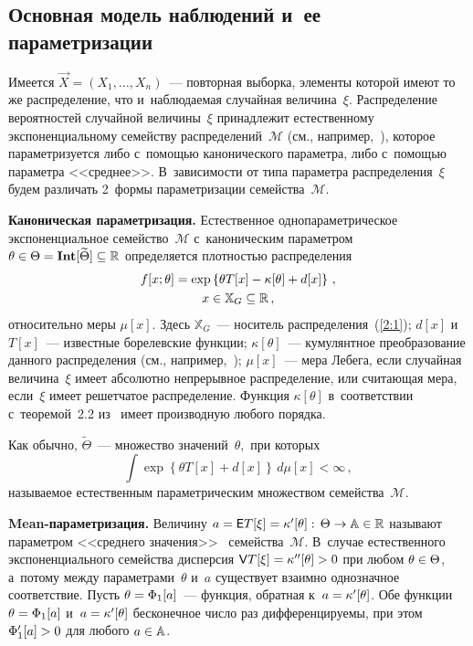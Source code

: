 \begin{multicols}{2}
 \vspace*{-9pt}

\section{Основная модель наблюдений и~ее параметризации}

\vspace*{-3pt}

   Имеется  $\vec{X}=(X_1 ,\ldots ,X_n) $~--- повторная выборка, элементы которой имеют то же распределение, что и~наблюдаемая случайная величина~$\xi$.
   Распределение вероятностей случайной величины~$\xi$ принадлежит естественному экспоненциальному семейству распределений~$\mathcal{M}$ (см., например,~\cite{15-ch}), которое параметризуется либо с~по\-мощью канонического параметра,  либо с~помощью параметра <<среднее>>.
   В~зависимости от типа параметра распределения~$\xi$ будем различать
   2~формы параметризации семейства~$\mathcal{M}$.

  \textbf{Каноническая параметризация.} Естественное однопараметрическое
  экспоненциальное семейство~$\mathcal{M}$ с~каноническим параметром
  $\theta  \hm\in \Theta \hm=\textbf{Int} [\widetilde{\Theta}]\subseteq \Rp$
  определяется плотностью распределения
 \begin{multline}
 f[x;\theta] =  \exp \left\{\theta T[x] - \kappa[\theta]+d[x]\right\}\,,\\
x\in {\mathbb X}_G \subseteq \mathbb{R}\,,
 \label{2:1}
 \end{multline}
  относительно меры $\mu[x]$. Здесь ${\mathbb X}_G$~--- 
  носитель распределения~(\ref{2:1}); $d[x]$ 
  и~$T[x]$~--- известные борелевские функции;
  $\kappa[\theta]$~--- кумулянтное преобразование данного распределения
  (см., например,~\cite[c.~13]{16-ch});
  $\mu[x]$~--- мера Лебега, если случайная величина~$\xi$
  имеет абсолютно непрерывное распределение, или считающая мера,
  если~$\xi$  имеет решетчатое распределение. Функция $\kappa[\theta]$
  в~соответствии с~теоремой~2.2 из~\cite{16-ch} имеет производную любого порядка.

 Как обычно, $\widetilde{\Theta}$~--- множество  значений~$\theta,$ при которых
 \begin{equation*}
 \int\limits \exp \left\{\theta  T[x]+d[x]\right\}\,d\mu[x]<\infty\,,
 \end{equation*}
 называемое естественным параметрическим множеством семейства~$\mathcal{M}$.

\textbf{Mean-параметризация.}
  Величину $a \hm= \Ep T[\xi]\hm=\kappa'[\theta]:\,\Theta\hm\rightarrow \mathbb {A}\hm\in \Rp$
  называют параметром <<среднего значения>>~\cite{15-ch, 16-ch} семейства~$\mathcal{M}$.
    В~случае естественного экспоненциального семейства
  дисперсия $\Vp T[\xi]\hm=\kappa''[\theta]\hm>0$ при любом $\theta\hm\in\Theta$,
  а~потому между параметрами~$\theta$ и~$a$ существует взаимно однозначное
  соответствие. Пусть $\theta\hm=\Phi_1[a]$~--- функция, обратная
  к~$a \hm= \kappa'[\theta]$.
  Обе функции $\theta\hm=\Phi_1[a]$ и~$a \hm= \kappa'[\theta]$ 
  бесконечное число раз дифферен\-ци\-ру\-емы, при этом $\Phi'_1[a] \hm> 0$ для любого $a \hm\in
  \mathbb{A}$.


\end{multicols}
